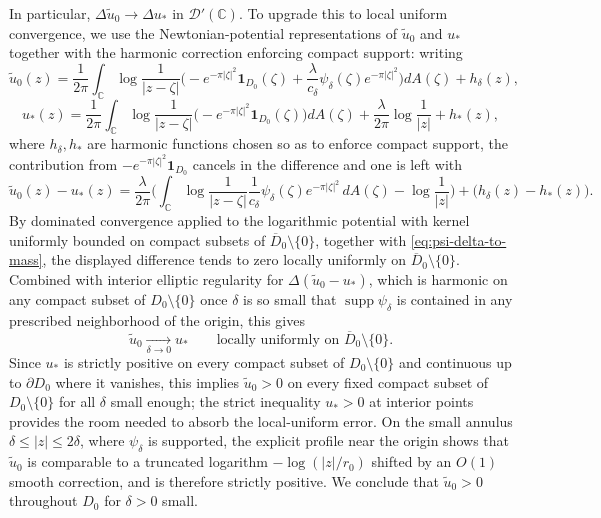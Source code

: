 \documentclass[a4paper,11pt,reqno]{amsart}
\numberwithin{equation}{section}
\theoremstyle{plain} %
\theoremstyle{definition} %
\theoremstyle{remark}
\DeclareMathOperator{\supp}{supp}
\newcommand{\C}{\mathbb{C}}
\begin{document}
In particular, $\Delta\widetilde u_0\to\Delta u_*$ in $\mathcal D'(\C)$. To upgrade this to local uniform convergence, we use the Newtonian-potential representations of $\widetilde u_0$ and $u_*$ together with the harmonic correction enforcing compact support: writing
\[
\widetilde u_0(z)
=
\frac{1}{2\pi}\int_\C \log\frac{1}{|z-\zeta|}\Big(-e^{-\pi|\zeta|^2}\mathbf 1_{D_0}(\zeta)+\frac{\lambda}{c_\delta}\psi_\delta(\zeta)e^{-\pi|\zeta|^2}\Big)dA(\zeta)+h_\delta(z),
\]
\[
u_*(z)
=
\frac{1}{2\pi}\int_\C \log\frac{1}{|z-\zeta|}\Big(-e^{-\pi|\zeta|^2}\mathbf 1_{D_0}(\zeta)\Big)dA(\zeta)+\frac{\lambda}{2\pi}\log\frac{1}{|z|}+h_*(z),
\]
where $h_\delta,h_*$ are harmonic functions chosen so as to enforce compact support, the contribution from $-e^{-\pi|\zeta|^2}\mathbf 1_{D_0}$ cancels in the difference and one is left with
\[
\widetilde u_0(z)-u_*(z)
=
\frac{\lambda}{2\pi}\Big(\int_\C \log\frac{1}{|z-\zeta|}\frac{1}{c_\delta}\psi_\delta(\zeta)e^{-\pi|\zeta|^2}\,dA(\zeta)-\log\frac{1}{|z|}\Big)+\big(h_\delta(z)-h_*(z)\big).
\]
By dominated convergence applied to the logarithmic potential with kernel uniformly bounded on compact subsets of $\overline D_0\setminus\{0\}$, together with \eqref{eq:psi-delta-to-mass}, the displayed difference tends to zero locally uniformly on $\overline D_0\setminus\{0\}$. Combined with interior elliptic regularity for $\Delta(\widetilde u_0-u_*)$, which is harmonic on any compact subset of $D_0\setminus\{0\}$ once $\delta$ is so small that $\supp\psi_\delta$ is contained in any prescribed neighborhood of the origin, this gives
\[
\widetilde u_0\xrightarrow[\delta\to 0]{}u_* \qquad \text{locally uniformly on $\overline D_0\setminus\{0\}$}.
\]
Since $u_*$ is strictly positive on every compact subset of $D_0\setminus\{0\}$ and continuous up to $\partial D_0$ where it vanishes, this implies $\widetilde u_0>0$ on every fixed compact subset of $D_0\setminus\{0\}$ for all $\delta$ small enough; the strict inequality $u_*>0$ at interior points provides the room needed to absorb the local-uniform error. On the small annulus $\delta\le|z|\le 2\delta$, where $\psi_\delta$ is supported, the explicit profile near the origin shows that $\widetilde u_0$ is comparable to a truncated logarithm $-\log(|z|/r_0)$ shifted by an $O(1)$ smooth correction, and is therefore strictly positive. We conclude that $\widetilde u_0>0$ throughout $D_0$ for $\delta>0$ small.
\end{document}
